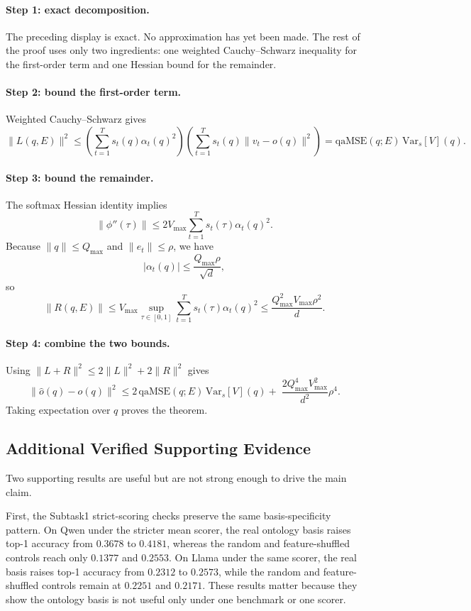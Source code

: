 \paragraph{Step 1: exact decomposition.}
The preceding display is exact. No approximation has yet been made. The rest of the proof uses only two ingredients: one weighted Cauchy--Schwarz inequality for the first-order term and one Hessian bound for the remainder.

\paragraph{Step 2: bound the first-order term.}
Weighted Cauchy--Schwarz gives
\[
\|L(q,E)\|^2
\le
\left(\sum_{t=1}^{T}s_t(q)\alpha_t(q)^2\right)
\left(\sum_{t=1}^{T}s_t(q)\|v_t-o(q)\|^2\right)
=
\mathrm{qaMSE}(q;E)\,\mathrm{Var}_{s}[V](q).
\]

\paragraph{Step 3: bound the remainder.}
The softmax Hessian identity implies
\[
\|\phi''(\tau)\|
\le
2V_{\max}\sum_{t=1}^{T}s_t(\tau)\alpha_t(q)^2.
\]
Because $\|q\|\le Q_{\max}$ and $\|e_t\|\le \rho$, we have
\[
|\alpha_t(q)|\le \frac{Q_{\max}\rho}{\sqrt d},
\]
so
\[
\|R(q,E)\|
\le
V_{\max}\sup_{\tau\in[0,1]}\sum_{t=1}^{T}s_t(\tau)\alpha_t(q)^2
\le
\frac{Q_{\max}^2V_{\max}\rho^2}{d}.
\]

\paragraph{Step 4: combine the two bounds.}
Using $\|L+R\|^2\le 2\|L\|^2+2\|R\|^2$ gives
\[
\|\hat o(q)-o(q)\|^2
\le
2\,\mathrm{qaMSE}(q;E)\,\mathrm{Var}_{s}[V](q)
+\;
\frac{2Q_{\max}^4V_{\max}^2}{d^2}\rho^4.
\]
Taking expectation over $q$ proves the theorem.

\subsection{Additional Verified Supporting Evidence}

Two supporting results are useful but are not strong enough to drive the main claim.

First, the Subtask1 strict-scoring checks preserve the same basis-specificity pattern. On Qwen under the stricter mean scorer, the real ontology basis raises top-1 accuracy from $0.3678$ to $0.4181$, whereas the random and feature-shuffled controls reach only $0.1377$ and $0.2553$. On Llama under the same scorer, the real basis raises top-1 accuracy from $0.2312$ to $0.2573$, while the random and feature-shuffled controls remain at $0.2251$ and $0.2171$. These results matter because they show the ontology basis is not useful only under one benchmark or one scorer.

